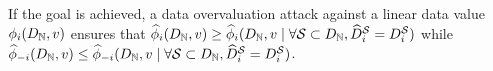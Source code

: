 \begin{lemma}
\label{lem:attack_success}
    If the goal is achieved, a data overvaluation attack against a linear data value $\phi_i(D_{\mathbb{N}}, v)$ ensures that $\widehat{\phi}_{i}(D_{\mathbb{N}}, v) \geq \widehat{\phi}_{i}(D_{\mathbb{N}}, v \mid \forall \mathcal{S} \subset D_{\mathbb{N}}, \widehat{D}^{\mathcal{S}}_{i} =  D^{\mathcal{S}}_{i})$ while $\widehat{\phi}_{-i}(D_{\mathbb{N}}, v) \leq \widehat{\phi}_{-i}(D_{\mathbb{N}}, v \mid \forall \mathcal{S} \subset D_{\mathbb{N}}, \widehat{D}^{\mathcal{S}}_{i} =  D^{\mathcal{S}}_{i})$.
\end{lemma}




